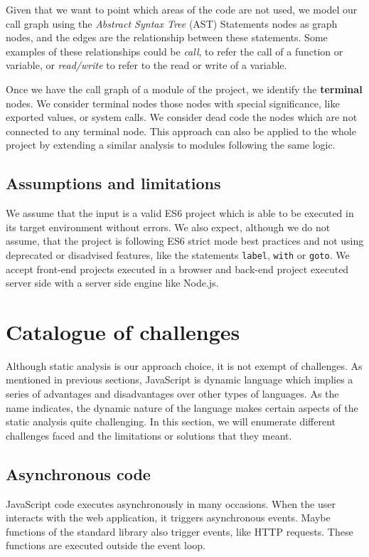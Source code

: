 \documentclass{uvamscse}
\begin{document}
Given that we want to point which areas of the code are not used, we model our call graph using the \textit{Abstract Syntax Tree} (AST) Statements nodes as graph nodes, and the edges are the relationship between these statements. Some examples of these relationships could be \textit{call}, to refer the call of a function or variable, or \textit{read/write} to refer to the read or write of a variable.

Once we have the call graph of a module of the project, we identify the \textbf{terminal} nodes. We consider terminal nodes those nodes with special significance, like exported values, or system calls. We consider dead code the nodes which are not connected to any terminal node. This approach can also be applied to the whole project by extending a similar analysis to modules following the same logic.

\subsection{Assumptions and limitations}
We assume that the input is a valid ES6 project which is able to be executed in its target environment without errors. We also expect, although we do not assume, that the project is following ES6 strict mode best practices and not using deprecated or disadvised features, like the statements \texttt{label}, \texttt{with} or \texttt{goto}. We accept front-end projects executed in a browser and back-end project executed server side with a server side engine like Node.js. 

\section{Catalogue of challenges}
Although static analysis is our approach choice, it is not exempt of challenges. As mentioned in previous sections, JavaScript is dynamic language which implies a series of advantages and disadvantages over other types of languages. As the name indicates, the dynamic nature of the language makes certain aspects of the static analysis quite challenging. In this section, we will enumerate different challenges faced and the limitations or solutions that they meant.

\subsection{Asynchronous code}
JavaScript code executes asynchronously in many occasions. When the user interacts with the web application, it triggers asynchronous events. Maybe functions of the standard library also trigger events, like HTTP requests. These functions are executed outside the event loop. 
\end{document}
